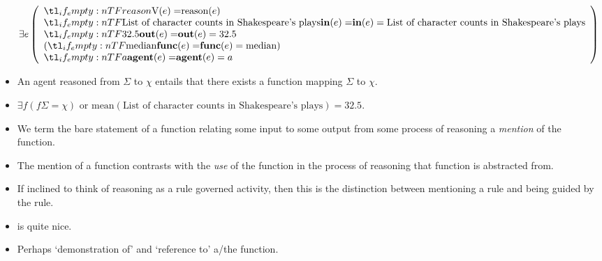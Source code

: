 \documentclass[10pt]{article}
\begin{document}
\begin{itemize}
    \[
    \exists e
    \left(
      \begin{array}{l}
        \everb{reason} \\
        \ein{\text{List of character counts in Shakespeare's plays}} \\
        \eout{32.5} \\
        (\efunc{\text{median}}) \\
        \eagentm{a}
      \end{array}
    \right)
  \]
\item An agent reasoned from \(\Sigma\) to \(\chi\) entails that there exists a function mapping \(\Sigma\) to \(\chi\).
\item \(\exists f(f\Sigma = \chi)\) or \(\text{mean}(\text{List of character counts in Shakespeare's plays}) = 32.5\).
\item We term the bare statement of a function relating some input to some output from some process of reasoning a \emph{mention} of the function.
\item The mention of a function contrasts with the \emph{use} of the function in the process of reasoning that function is abstracted from.
\item If inclined to think of reasoning as a rule governed activity, then this is the distinction between mentioning a rule and being guided by the rule.
\item \textcite{Simchen:2001aa} is quite nice.
\item Perhaps `demonstration of' and `reference to' a/the function.
\end{itemize}
\end{document}

